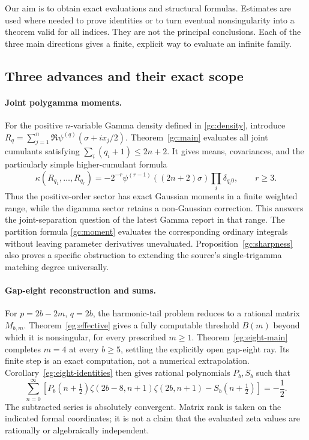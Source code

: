 \documentclass[11pt,a4paper]{article}
\numberwithin{equation}{section}
\theoremstyle{definition}
\theoremstyle{remark}
\begin{document}
Our aim is to obtain exact evaluations and structural formulas. Estimates
are used where needed to prove identities or to turn eventual
nonsingularity into a theorem valid for all indices. They are not the
principal conclusions. Each of the three main directions gives a
finite, explicit way to evaluate an infinite family.

\subsection{Three advances and their exact scope}

\paragraph{Joint polygamma moments.}
For the positive $n$-variable Gamma density defined in
\eqref{gc:density}, introduce
$R_q=\sum_{j=1}^n\Re\psi^{(q)}(\sigma+ix_j/2)$.
Theorem~\ref{gc:main} evaluates all joint cumulants satisfying
$\sum_i(q_i+1)\le2n+2$. It gives means, covariances, and the particularly
simple higher-cumulant formula
\[
 \kappa(R_{q_1},\ldots,R_{q_r})
 =-2^{-r}\psi^{(r-1)}((2n+2)\sigma)
          \prod_i\delta_{q_i0},\qquad r\ge3.
\]
Thus the positive-order sector has exact Gaussian moments in a finite
weighted range, while the digamma sector retains a non-Gaussian
correction. This answers the joint-separation question of the latest
Gamma report in that range. The partition formula
\eqref{gc:moment} evaluates the corresponding ordinary integrals without
leaving parameter derivatives unevaluated. Proposition~\ref{gc:sharpness}
also proves a specific obstruction to extending the source's
single-trigamma matching degree universally.

\paragraph{Gap-eight reconstruction and sums.}
For $p=2b-2m$, $q=2b$, the harmonic-tail problem reduces to a rational
matrix $M_{b,m}$. Theorem~\ref{eg:effective} gives a fully computable
threshold $B(m)$ beyond which it is nonsingular, for every prescribed
$m\ge1$. Theorem~\ref{eg:eight-main} completes $m=4$ at every $b\ge5$,
settling the explicitly open gap-eight ray. Its finite step is an exact
computation, not a numerical extrapolation. Corollary~\ref{eg:eight-identities}
then gives rational polynomials $P_b,S_b$ such that
\[
 \sum_{n=0}^{\infty}\left[
 P_b(n+\tfrac12)\zeta(2b-8,n+1)\zeta(2b,n+1)
       -S_b(n+\tfrac12)\right]=-\frac12.
\]
The subtracted series is absolutely convergent. Matrix rank is taken on
the indicated formal coordinates; it is not a claim that the evaluated
zeta values are rationally or algebraically independent.
\end{document}
